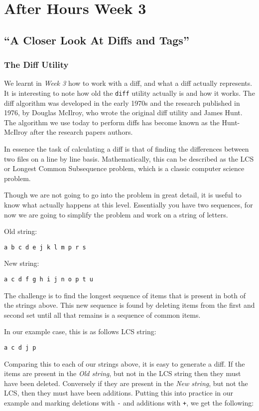 \chapter{After Hours Week 3}
\section{``A Closer Look At Diffs and Tags''}
\subsection{The Diff Utility}
We learnt in \emph{Week 3} how to work with a diff, and what a diff actually represents.
It is interesting to note how old the \texttt{diff} utility actually is and how it works.
The diff algorithm was developed in the early 1970s and the research published in 1976, by Douglas McIlroy, who wrote the original diff utility and James Hunt.
The algorithm we use today to perform diffs has become known as the Hunt-McIlroy after the research papers authors.

In essence the task of calculating a diff is that of finding the differences between two files on a line by line basis.
Mathematically, this can be described as the LCS or Longest Common Subsequence problem, which is a classic computer science problem.

Though we are not going to go into the problem in great detail, it is useful to know what actually happens at this level.
Essentially you have two sequences, for now we are going to simplify the problem and work on a string of letters.

Old string:
\begin{Verbatim}
a b c d e j k l m p r s
\end{Verbatim}

New string:
\begin{Verbatim}
a c d f g h i j n o p t u
\end{Verbatim}

The challenge is to find the longest sequence of items that is present in both of the strings above.
This new sequence is found by deleting items from the first and second set until all that remains is a sequence of common items.

In our example case, this is as follows
LCS string:
\begin{Verbatim}
a c d j p
\end{Verbatim}

Comparing this to each of our strings above, it is easy to generate a diff.
If the items are present in the \emph{Old string}, but not in the LCS string then they must have been deleted.
Conversely if they are present in the \emph{New string}, but not the LCS, then they must have been additions.
Putting this into practice in our example and marking deletions with \texttt{-} and additions with \texttt{+}, we get the following:

